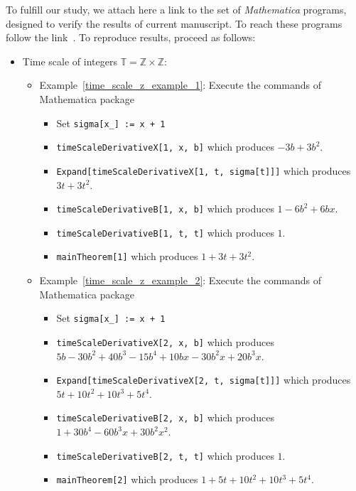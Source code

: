 To fulfill our study, we attach here a link to the set of \emph{Mathematica} programs, designed to verify the results of current manuscript.
To reach these programs follow the link~\cite{kolosov2022mathematica}.
To reproduce results, proceed as follows:
\begin{itemize}
    \setlength\itemsep{1em}
    \item Time scale of integers $\mathbb{T} = \mathbb{Z} \times \mathbb{Z}$:
    \begin{itemize}
        \setlength\itemsep{0.5em}
        \item Example~\ref{time_scale_z_example_1}:
        Execute the commands of Mathematica package
        \begin{itemize}
            \item Set \texttt{sigma[x\_] := x + 1}
            \item \texttt{timeScaleDerivativeX[1, x, b]} which produces $-3 b + 3 b^2$.
            \item \texttt{Expand[timeScaleDerivativeX[1, t, sigma[t]]]} which produces $3 t + 3 t^2$.
            \item \texttt{timeScaleDerivativeB[1, x, b]} which produces $1 - 6 b^2 + 6 b x$.
            \item \texttt{timeScaleDerivativeB[1, t, t]} which produces $1$.
            \item \texttt{mainTheorem[1]} which produces $1 + 3 t + 3 t^2$.
        \end{itemize}
        \item Example~\ref{time_scale_z_example_2}:
        Execute the commands of Mathematica package
        \begin{itemize}
            \item Set \texttt{sigma[x\_] := x + 1}
            \item \texttt{timeScaleDerivativeX[2, x, b]} which produces
            $5 b - 30 b^2 + 40 b^3 - 15 b^4 + 10 b x - 30 b^2 x + 20 b^3 x$.
            \item \texttt{Expand[timeScaleDerivativeX[2, t, sigma[t]]]} which produces $5 t + 10 t^2 + 10 t^3 + 5 t^4$.
            \item \texttt{timeScaleDerivativeB[2, x, b]} which produces $1 + 30 b^4 - 60 b^3 x + 30 b^2 x^2$.
            \item \texttt{timeScaleDerivativeB[2, t, t]} which produces $1$.
            \item \texttt{mainTheorem[2]} which produces $1 + 5 t + 10 t^2 + 10 t^3 + 5 t^4$.
        \end{itemize}

\end{itemize}
\end{itemize}
